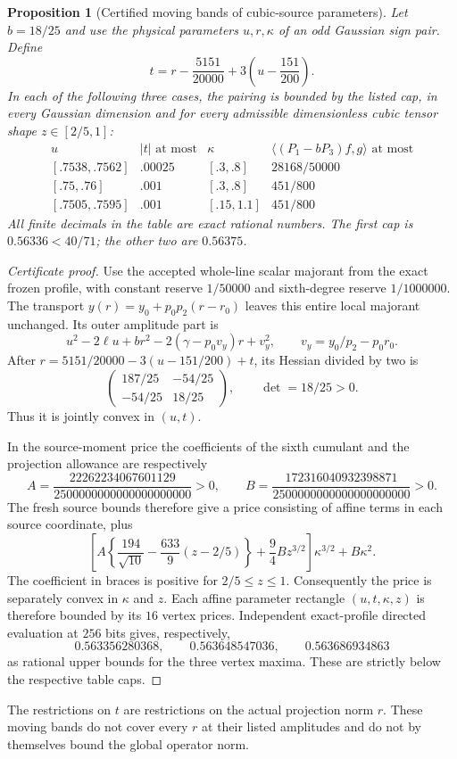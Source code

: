 \documentclass[11pt]{article}
\newtheorem{proposition}[theorem]{Proposition}
\begin{document}
\begin{proposition}[Certified moving bands of cubic-source parameters]
\label{prop:r3-certified-moving-polygons}
Let $b=18/25$ and use the physical parameters $u,r,\kappa$ of an odd
Gaussian sign pair.  Define
\[
 t=r-\frac{5151}{20000}+3\left(u-\frac{151}{200}\right).
\]
In each of the following three cases, the pairing is bounded by the
listed cap, in every Gaussian dimension and for every admissible
dimensionless cubic tensor shape $z\in[2/5,1]$:
\[
\begin{array}{c|c|c|c}
 u& |t|\text{ at most}&\kappa&
 \langle(P_1-bP_3)f,g\rangle\text{ at most}\\ \hline
 {[.7538,.7562]}&.00025&[.3,.8]&28168/50000\\
 {[.75,.76]}&.001&[.3,.8]&451/800\\
 {[.7505,.7595]}&.001&[.15,1.1]&451/800
\end{array}
\]
All finite decimals in the table are exact rational numbers.  The first
cap is $0.56336<40/71$; the other two are $0.56375$.
\end{proposition}
\begin{proof}[Certificate proof]
Use the accepted whole-line scalar majorant from the exact frozen profile,
with constant reserve $1/50000$ and sixth-degree reserve $1/1000000$.
The transport $y(r)=y_0+p_0p_2(r-r_0)$ leaves this entire local majorant
unchanged.  Its outer amplitude part is
\[
 u^2-2\ell u+br^2-2(\gamma-p_0v_y)r+v_y^2,
 \qquad v_y=y_0/p_2-p_0r_0.
\]
After $r=5151/20000-3(u-151/200)+t$, its Hessian divided by two is
\[
 \begin{pmatrix}187/25&-54/25\\-54/25&18/25\end{pmatrix},
 \qquad \det=18/25>0.
\]
Thus it is jointly convex in $(u,t)$.

In the source-moment price the coefficients of the sixth cumulant and
the projection allowance are respectively
\[
 A=\frac{22262234067601129}{2500000000000000000000}>0,
 \qquad
 B=\frac{172316040932398871}{2500000000000000000000}>0.
\]
The fresh source bounds therefore give a price consisting of affine
terms in each source coordinate, plus
\[
 \left[A\left\{\frac{194}{\sqrt{10}}
       -\frac{633}{9}(z-2/5)\right\}
       +\frac94Bz^{3/2}\right]\kappa^{3/2}+B\kappa^2.
\]
The coefficient in braces is positive for $2/5\leq z\leq1$.
Consequently the price is separately convex in $\kappa$ and $z$.
Each affine parameter rectangle $(u,t,\kappa,z)$ is therefore bounded
by its $16$ vertex prices.  Independent exact-profile directed evaluation
at $256$ bits gives, respectively,
\[
 0.563356280368,\qquad 0.563648547036,\qquad 0.563686934863
\]
as rational upper bounds for the three vertex maxima.  These are strictly
below the respective table caps.
\end{proof}
The restrictions on $t$ are restrictions on the actual projection norm $r$.
These moving bands do not cover every $r$ at their listed amplitudes and
do not by themselves bound the global operator norm.
\end{document}
